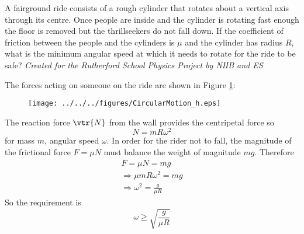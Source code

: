 \begin{problem}
{A fairground ride consists of a rough cylinder that rotates about a vertical axis through its centre. Once people are inside and the cylinder is rotating fast enough the floor is removed but the thrillseekers do not fall down. If the coefficient of friction between the people and the cylinders is $\mu$ and the cylinder has radius $R$, what is the minimum angular speed at which it needs to rotate for the ride to be safe?
} 
{\textit{Created for the Rutherford School Physics Project by NHB and ES}}
{The forces acting on someone on the ride are shown in Figure \ref{fig:CircularMotion_h}:
\begin{figure}[h]
\centering
\texttt{[image: ../../../figures/CircularMotion\_h.eps]}
\caption{}
\label{fig:CircularMotion_h}
\end{figure}
The reaction force $\vtr{N}$ from the wall provides the centripetal force so
\begin{equation*}
N=mR\omega^2
\end{equation*}
for mass $m$, angular speed $\omega$. In order for the rider not to fall, the magnitude of the frictional force $F=\mu N$ must balance the weight of magnitude $mg$. Therefore
\begin{align*}
F=\mu N=mg \\
\Rightarrow \mu mR\omega^2=mg \\
\Rightarrow \omega^2=\frac{g}{\mu R}
\end{align*}
So the requirement is 
\begin{equation*}
\omega\ge\sqrt{\frac{g}{\mu R}}
\end{equation*}
}
\end{problem}